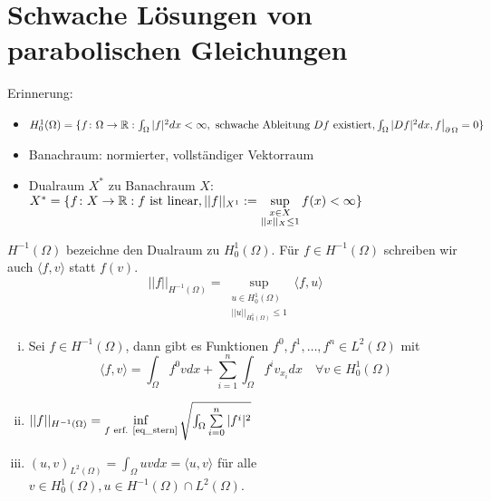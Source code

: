 \section{Schwache Lösungen von parabolischen Gleichungen}
\label{sec:para12}
	
Erinnerung: \begin{itemize}
	\item $H_0^1(\Omega) = \{ f \colon \Omega \rightarrow \mathbb{R} : \int_{\Omega} |f|^2 dx < \infty, \text{ schwache Ableitung } Df \text{ existiert}, \int_{\Omega} |Df|^2 dx, f \big|_{\operatorname{\partial} \Omega} = 0\}$
	\item Banachraum: normierter, vollständiger Vektorraum
	\item Dualraum $X^*$ zu Banachraum $X$: $X^* = \{f \colon X \rightarrow \mathbb{R} : f \text{ ist linear}, ||f||_{X^1} := \sup\limits_{\substack{x \in X \\ ||x||_X \leq 1}} f(x) < \infty\}$
	\end{itemize}
	
\begin{defn}
	$H^{-1}(\Omega)$ bezeichne den Dualraum zu $H_0^1(\Omega)$. Für $f \in H^{-1}(\Omega)$ schreiben wir auch $\langle f,v \rangle$ statt $f(v)$.
	\[ ||f||_{H^{-1}(\Omega)} = \sup\limits_{\substack{u \in H_0^1(\Omega) \\ ||u||_{H_0^1(\Omega)} \leq 1}} \langle f,u \rangle \]
\end{defn}
	
\begin{thm}
	\begin{enumerate}[(i)]
		\item Sei $f \in H^{-1}(\Omega)$, dann gibt es Funktionen $f^0,f^1,\dots,f^n \in L^2(\Omega)$ mit
		\begin{equation}
			\langle f,v \rangle = \int_{\Omega} f^0 v dx + \sum\limits_{i=1}^{n} \int_{\Omega} f^i v_{x_i} dx \quad \forall v \in H_0^1(\Omega) \label{eq_stern}
		\end{equation}
		\item $||f||_{H^{-1}(\Omega)} = \inf\limits_{f \text{ erf. \eqref{eq_stern}}} \sqrt{\int_{\Omega} \sum\limits_{i=0}^{n} |f^i|^2}$
		\item $(u,v)_{L^2(\Omega)} = \int_{\Omega} uvdx = \langle u,v \rangle$ für alle $v \in H_0^1(\Omega), u \in H^{-1}(\Omega) \cap L^2(\Omega)$.
	\end{enumerate}
\end{thm}
	
